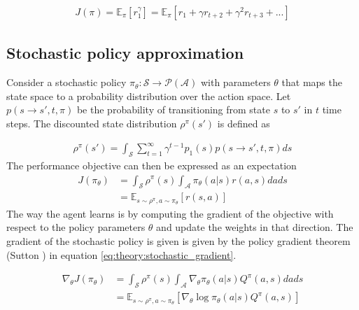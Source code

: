 \documentclass[class=book, crop=false]{standalone}
\begin{document}
\begin{equation}
   \begin{aligned}\label{eq:theory:max_discounted_return}
J(\pi)
= \mathbb{E}_{\pi}[r^{\gamma}_{1}]
= \mathbb{E}_{\pi}[ r_{1} + \gamma r_{t+2} + \gamma^{2} r_{t+3} + ...]
\end{aligned} 
\end{equation}

\subsection{Stochastic policy approximation}\label{section:stochastic_policy_approx}
Consider a stochastic policy $\pi_{\theta}: \mathcal{S}\to \mathcal{P}(\mathcal{A})$ with parameters $\theta$ that maps the state space to a probability distribution over the action space. Let $p(s\to s',t,\pi)$ be the probability of transitioning from state $s$ to $s'$ in $t$ time steps. The discounted state distribution $\rho^{\pi}(s')$ is defined as   

\begin{equation}
   \begin{aligned}\label{eq:theory:discounted_state_distribution}
    \rho^{\pi}(s') = \int_{\mathcal{S}}\sum_{t=1}^{\infty }\gamma^{t-1}p_{1}(s)
    p(s \to s',t,\pi)ds
\end{aligned} 
\end{equation}
The performance objective can then be expressed as an expectation
\begin{equation}
   \begin{aligned}\label{eq:theory:objective_expected_stochastic}
    J(\pi_{\theta}) &= 
    \int_{\mathcal{S}}\rho^{\pi}(s) \int_{\mathcal{A}}\pi_{\theta}(a|s)r(a,s)da ds 
    \\
    &=
    \mathbb{E}_{s\sim \rho^{\pi},a \sim \pi_{\theta}}[r(s,a)]
\end{aligned} 
\end{equation}
 The way the agent learns is by computing the gradient of the objective with respect to the policy parameters $\theta$ and update the weights in that direction. The gradient of the stochastic policy is given is given by the policy gradient theorem (Sutton \cite{Sutton1998}) in equation \eqref{eq:theory:stochastic_gradient}.

\begin{equation}
   \begin{aligned}\label{eq:theory:stochastic_gradient}
    \nabla_{\theta} J(\pi_{\theta}) &= 
     \int_{\mathcal{S}}\rho^{\pi}(s)
     \int_{\mathcal{A}} \nabla_{\theta} \pi_{\theta}(a|s)Q^{\pi}(a,s)da ds
     \\
     &= \mathbb{E}_{s\sim \rho^{\pi},a \sim \pi_{\theta}}
     [\nabla_{\theta} \log \pi_{\theta}(a|s)Q^{\pi}(a,s) ]
\end{aligned} 
\end{equation}
\end{document}
